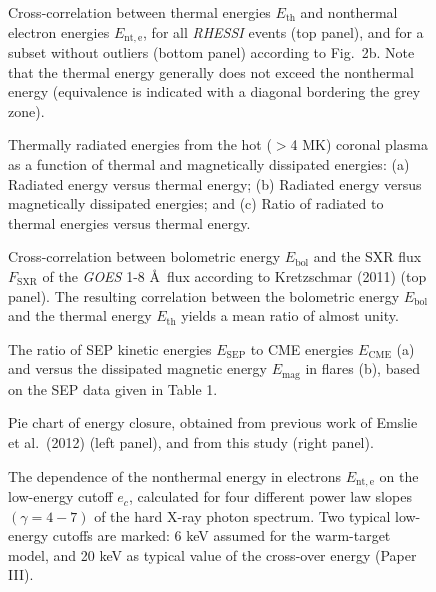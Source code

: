 \documentclass[10pt,preprint]{aastex}  %
\def\ang{\AA}
\begin{document}
\begin{figure}
\caption{Cross-correlation between thermal energies $E_{\mathrm{th}}$
and nonthermal electron energies $E_{\mathrm{nt,e}}$, for all {\it RHESSI}
events (top panel), and for a subset without outliers 
(bottom panel) according to Fig.~2b. Note that the thermal energy 
generally does not exceed the nonthermal energy (equivalence
is indicated with a diagonal bordering the grey zone).}
\end{figure}

\begin{figure}
\caption{Thermally radiated energies from the hot ($>$4 MK) 
coronal plasma as a function of thermal and magnetically dissipated 
energies: (a) Radiated energy versus thermal energy; (b) Radiated energy 
versus magnetically dissipated energies; and (c) Ratio of radiated to thermal 
energies versus thermal energy.}
\end{figure}

\begin{figure}
\caption{Cross-correlation between bolometric energy $E_{\mathrm{bol}}$ and
the SXR flux $F_{\mathrm{SXR}}$ of the {\it GOES} 1-8 \ang\ flux according
to Kretzschmar (2011) (top panel). The resulting correlation between
the bolometric energy $E_{\mathrm{bol}}$ and the thermal energy 
$E_{\mathrm{th}}$ yields a mean ratio of almost unity.}
\end{figure}

\begin{figure}
\caption{The ratio of SEP kinetic energies $E_{\mathrm{SEP}}$ to CME energies
$E_{\mathrm{CME}}$ (a) and versus the dissipated magnetic energy
$E_{\mathrm{mag}}$ in flares (b), based on the SEP data
given in Table 1.}
\end{figure}

\begin{figure}
\caption{Pie chart of energy closure, obtained from previous work of
Emslie et al.~(2012) (left panel), and from this study (right panel).}
\end{figure}

\begin{figure}
\caption{The dependence of the nonthermal energy in electrons
$E_{\mathrm{nt,e}}$ on the low-energy cutoff $e_c$, calculated for four
different power law slopes $(\gamma=4-7)$ of the hard X-ray
photon spectrum. Two typical low-energy cutoffs are marked:
6 keV assumed for the warm-target model, and 20 keV as typical value
of the cross-over energy (Paper III).}
\end{figure}
\end{document}

